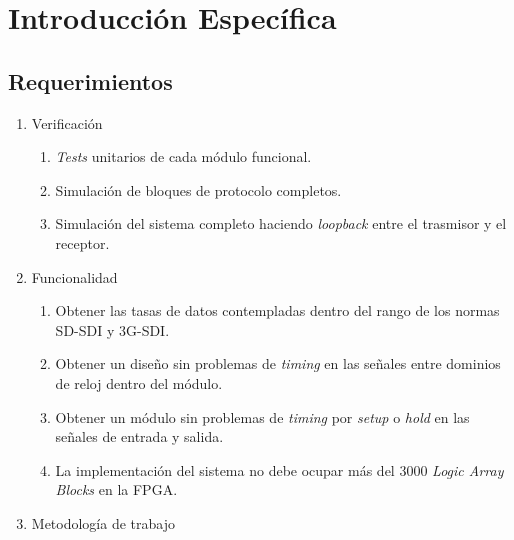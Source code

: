 \chapter{Introducción Específica}\label{Chapter2}

\section{Requerimientos}

\begin{enumerate}
    \item Verificación
    \begin{enumerate}
        \item \textit{Tests} unitarios de cada módulo funcional.
        \item Simulación de bloques de protocolo completos.
        \item Simulación del sistema completo haciendo \textit{loopback} entre el trasmisor y el receptor.
    \end{enumerate}
    \item Funcionalidad
    \begin{enumerate}
        \item Obtener las tasas de datos contempladas dentro del rango de los normas SD-SDI y 3G-SDI\@.
        \item Obtener un diseño sin problemas de \textit{timing} en las señales entre dominios de reloj
        dentro del módulo.
        \item Obtener un módulo sin problemas de \textit{timing} por \textit{setup} o \textit{hold} en las señales de entrada y salida.
        \item La implementación del sistema no debe ocupar más del 3000 \textit{Logic Array Blocks} en la FPGA\@.
    \end{enumerate}
    \item Metodología de trabajo
    \begin{enumerate}

\end{enumerate}
\end{enumerate}
